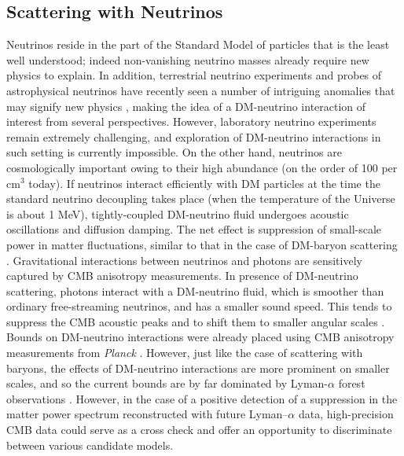 \documentclass[12pt]{article}
\begin{document}
\subsection{Scattering with Neutrinos}

Neutrinos reside in the part of the Standard Model of particles that is the least well understood; indeed non-vanishing neutrino masses already require new physics to explain. 
In addition, terrestrial neutrino experiments and probes of astrophysical neutrinos have recently seen a number of intriguing anomalies that may signify new physics \cite{miniboone, others, ANITA}, making the idea of a DM-neutrino interaction of interest from several perspectives. 
However, laboratory neutrino experiments remain extremely challenging, and exploration of DM-neutrino interactions in such setting is currently impossible. 
On the other hand, neutrinos are cosmologically important owing to their high abundance (on the order of 100 per cm$^3$ today).
If neutrinos interact efficiently with DM particles at the time the standard neutrino decoupling takes place (when the temperature of the Universe is about 1 MeV), tightly-coupled DM-neutrino fluid undergoes acoustic oscillations and diffusion damping. 
The net effect is suppression of small-scale power in matter fluctuations, similar to that in the case of DM-baryon scattering \cite{Boehm:2001hm,Mangano:2006mp}.
Gravitational interactions between neutrinos and photons are sensitively captured by CMB anisotropy measurements.
In presence of DM-neutrino scattering, photons interact with a DM-neutrino fluid, which is smoother than ordinary free-streaming neutrinos, and has a smaller sound speed. 
This tends to suppress the CMB acoustic peaks and to shift them to smaller angular scales \cite{Wilkinson:2014ksa}. 
Bounds on DM-neutrino interactions were already placed using CMB anisotropy measurements from \textit{Planck}  \cite{Escudero:2015yka,DiValentino:2017oaw,Diacoumis:2018ezi}.
However, just like the case of scattering with baryons, the effects of DM-neutrino interactions are more prominent on smaller scales, and so the current bounds are by far dominated by Lyman-$\alpha$ forest observations \cite{Wilkinson:2014ksa}.
However, in the case of a positive detection of a suppression in the matter power spectrum reconstructed with future Lyman--$\alpha$ data, high-precision CMB data could serve as a cross check and offer an opportunity to discriminate between various candidate models.

\vspace{-0.3cm}
\end{document}
